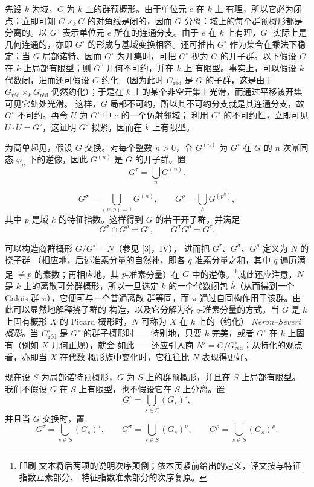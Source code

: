 先设 $k$ 为域，$G$ 为 $k$ 上的群预概形。由于单位元 $e$ 在 $k$ 上
有理，所以它必为闭点；立即可知 $G\times_kG$ 的对角线是闭的，因而
$G$ 分离：域上的每个群预概形都是分离的。以 $G^\circ$ 表示单位元
$e$ 所在的连通分支。由于 $e$ 在 $k$ 上有理，$G^\circ$ 实际上是
几何连通的，亦即 $G^\circ$ 的形成与基域变换相容。还可推出
$G^\circ$ 作为集合在乘法下稳定；当 $G$ 局部诺特、因而
$G^\circ$ 为开集时，可把 $G^\circ$ 视为 $G$ 的开子群。以下假设
$G$ 在 $k$ 上局部有限型；则 $G^\circ$ 几何不可约，并在 $k$ 上
有限型。事实上，可以假设 $k$ 代数闭，进而还可假设 $G$ 约化
（因为此时 $G_{\mathrm{réd}}$ 是 $G$ 的子群，这是由于
$G_{\mathrm{réd}}\times_kG_{\mathrm{réd}}$ 仍然约化）；于是在 $k$
上的某个非空开集上光滑，而通过平移该开集可见它处处光滑。
这样，$G$ 局部不可约，所以其不可约分支就是其连通分支，故
$G^\circ$ 不可约。再令 $U$ 为 $G^\circ$ 中 $e$ 的一个仿射邻域；
利用 $G^\circ$ 的不可约性，立即可见
$U\cdot U=G^\circ$，这证明 $G^\circ$ 拟紧，因而在 $k$ 上有限型。

为简单起见，假设 $G$ 交换。对每个整数 $n>0$，令 $G^{(n)}$ 为
$G^\circ$ 在 $G$ 的 $n$ 次幂同态 $\varphi_n$ 下的逆像，因此
$G^{(n)}$ 是 $G$ 的开子群。置
\[
G^\tau=\bigcup_nG^{(n)}.
\]

\[
G^\sigma=\bigcup_{(n,p)=1}G^{(n)},
\qquad
G^\rho=\bigcup_hG^{(p^h)},
\]
其中 $p$ 是域 $k$ 的特征指数。这样得到 $G$ 的若干开子群，并满足
\[
G^\sigma\cap G^\rho=G^\circ,
\qquad
G^\sigma G^\rho=G^\tau.
\]

 可以构造商群概形 $G/G^\circ=N$（参见 [3]，IV），
进而把 $G^\tau$、$G^\sigma$、$G^\rho$ 定义为 $N$ 的挠子群
（相应地，后述准素分量的自然补，即各 $q$-准素分量之和，其中 $q$
遍历满足 $\neq p$ 的素数；再相应地，其 $p$-准素分量）在 $G$ 中的逆像。\footnote{印刷
文本将后两项的说明次序颠倒；依本页紧前给出的定义，译文按与特征指数互素部分、
特征指数准素部分的次序复原。}就此还应注意，$N$
是 $k$ 上的离散可分群概形，所以一旦选定 $k$ 的一个代数闭包
$\overline k$（从而得到一个 Galois 群 $\pi$），它便可与一个普通离散
群等同，而 $\pi$ 通过自同构作用于该群。由此可以显然地解释挠子群的
构造，以及它分解为各 $q$-准素分量的方式。当 $G$ 是 $k$ 上固有概形
$X$ 的 Picard 概形时，$N$ 可称为 $X$ 在 $k$ 上的（约化）
\emph{Néron--Severi 概形}。当
$G^\circ_{\mathrm{réd}}$ 是 $G^\circ$ 的群子概形时——特别地，只要
$k$ 完美，或者 $G^\circ$ 在 $k$ 上固有（例如 $X$ 几何正规），就会
如此——还应引入商
$N'=G/G^\circ_{\mathrm{réd}}$；从特化的观点看，亦即当 $X$ 在代数
概形族中变化时，它往往比 $N$ 表现得更好。

现在设 $S$ 为局部诺特预概形，$G$ 为 $S$ 上的群预概形，并且在 $S$ 上局部有限型。
我们不假设 $G$ 在 $S$ 上有限型，也不假设它在 $S$ 上分离。置
\[
G^\circ=\bigcup_{s\in S}(G_s)^\circ,
\]
并且当 $G$ 交换时，置
\[
G^\tau=\bigcup_{s\in S}(G_s)^\tau,
\qquad
G^\sigma=\bigcup_{s\in S}(G_s)^\sigma,
\qquad
G^\rho=\bigcup_{s\in S}(G_s)^\rho.
\]

